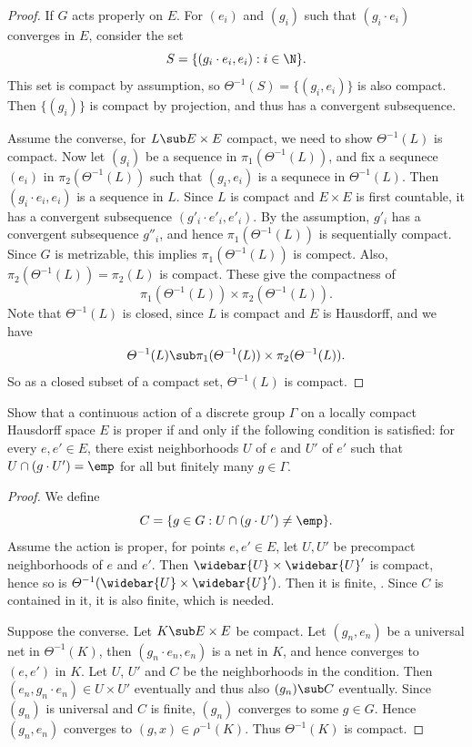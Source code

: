\begin{proof}
If $G$ acts properly on $E$. For $(e_i)$ and $(g_i)$ such that $(g_i\cdot e_i)$ converges in $E$, consider the set 
\[S=\{(g_i\cdot e_i,e_i):i\in\N\}.\]
This set is compact by assumption, so $\varTheta^{-1}(S)=\{(g_i,e_i)\}$ is also compact. Then $\{(g_i)\}$ is compact by projection, and thus has a convergent subsequence.\par
Assume the converse,  for $L\sub E\times E$ compact, we need to show $\varTheta^{-1}(L)$ is compact. Now let $(g_i)$ be a sequence in $\pi_1(\varTheta^{-1}(L))$, and fix a sequnece $(e_i)$ in $\pi_2(\varTheta^{-1}(L))$ such that $(g_i,e_i)$ is a sequnece in $\varTheta^{-1}(L)$. Then $(g_i\cdot e_i,e_i)$ is a sequence in $L$. Since $L$ is compact and $E\times E$ is first countable, it has a convergent subsequence $(g'_i\cdot e'_i,e'_i)$. By the assumption, $g'_i$ has a convergent subsequence $g''_i$, and hence $\pi_1(\varTheta^{-1}(L))$ is sequentially compact. Since $G$ is metrizable, this implies $\pi_1(\varTheta^{-1}(L))$ is compect. Also, $\pi_2(\varTheta^{-1}(L))=\pi_2(L)$ is compact. These give the compactness of \[\pi_1(\varTheta^{-1}(L))\times\pi_2(\varTheta^{-1}(L)).\]
Note that $\varTheta^{-1}(L)$ is closed, since $L$ is compact and $E$ is Hausdorff, and we have
\[\varTheta^{-1}(L)\sub\pi_1(\varTheta^{-1}(L))\times\pi_2(\varTheta^{-1}(L)).\]
So as a closed subset of a compact set, $\varTheta^{-1}(L)$ is compact.
\end{proof}
\begin{exercise}
Show that a continuous action of a discrete group $\Gamma$ on a locally compact
Hausdorff space $E$ is proper if and only if the following condition is satisfied:
for every $e,e'\in E$, there exist neighborhoods $U$ of $e$ and $U'$ of $e'$ such that $U\cap(g\cdot U')=\emp$ for all but finitely many $g\in\Gamma$.
\end{exercise}
\begin{proof}
We define
\[C=\{g\in G:U\cap(g\cdot U')\neq\emp\}.\]
Assume the action is proper, for points $e,e'\in E$, let $U,U'$ be precompact neighborhoods of $e$ and $e'$. Then $\widebar{U}\times\widebar{U}'$ is compact, hence so is $\varTheta^{-1}(\widebar{U}\times\widebar{U}')$. Then it is finite, . Since $C$ is contained in it, it is also finite, which is needed.\par
Suppose the converse. Let $K\sub E\times E$ be compact. Let $(g_n,e_n)$ be a universal net in $\varTheta^{-1}(K)$, then $(g_n\cdot e_n,e_n)$ is a net in $K$, and hence converges to $(e,e')$ in $K$. Let $U$, $U'$ and $C$ be the neighborhoods in the condition. Then $(e_n,g_n\cdot e_n)\in U\times U'$ eventually and thus also $(g_n)\sub C$ eventually. Since $(g_n)$ is universal and $C$ is finite, $(g_n)$ converges to some $g\in G$. Hence $(g_n,e_n)$ converges to $(g,x)\in\rho^{-1}(K)$. Thus $\varTheta^{-1}(K)$ is compact.
\end{proof}
